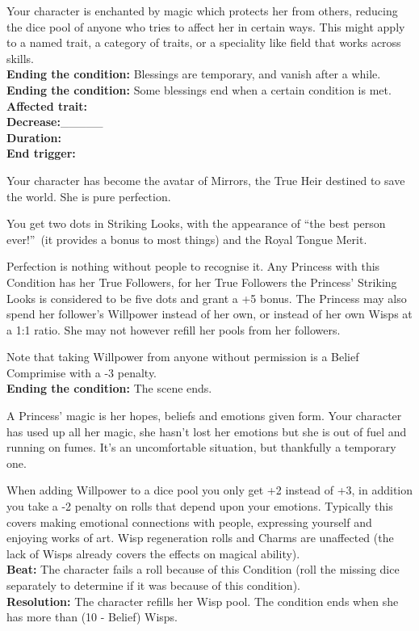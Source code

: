\documentclass[10pt, frontgrid, backgrid]{flacards}
\begin{document}
{Your character is enchanted by magic which protects her from others, reducing the dice pool of anyone who tries to affect her in certain ways. This might apply to a named trait, a category of traits, or a speciality like field that works across skills.\\
\textbf{Ending the condition:} Blessings are temporary, and vanish after a while.\\
\textbf{Ending the condition:} Some blessings end when a certain condition is met.\\
\textbf{Affected trait:}\fillunderline \\
\textbf{Decrease:}\_\_\_\_\_\\
\textbf{Duration:}\fillunderline \\
\textbf{End trigger:}\fillunderline}

{Your character has become the avatar of Mirrors, the True Heir destined to save the world. She is pure perfection. 

You get two dots in Striking Looks, with the appearance of \textquotedblleft the best person ever!\textquotedblright\, (it provides a bonus to most things) and the Royal Tongue Merit. 

Perfection is nothing without people to recognise it. Any Princess with this Condition has her True Followers, for her True Followers the Princess' Striking Looks is considered to be five dots and grant a +5 bonus. The Princess may also spend her follower's Willpower instead of her own, or instead of her own Wisps at a 1:1 ratio. She may not however refill her pools from her followers.

Note that taking Willpower from anyone without permission is a Belief Comprimise with a -3 penalty.\\
\textbf{Ending the condition:} The scene ends. }

{A Princess' magic is her hopes, beliefs and emotions given form. Your character has used up all her magic, she hasn't lost her emotions but she is out of fuel and running on fumes. It's an uncomfortable situation, but thankfully a temporary one. 

When adding Willpower to a dice pool you only get +2 instead of +3, in addition you take a -2 penalty on rolls that depend upon your emotions. Typically this covers making emotional connections with people, expressing yourself and enjoying works of art. Wisp regeneration rolls and Charms are unaffected (the lack of Wisps already covers the effects on magical ability). \\
\textbf{Beat:} The character fails a roll because of this Condition (roll the missing dice separately to determine if it was because of this condition).\\
\textbf{Resolution:} The character refills her Wisp pool. The condition ends when she has more than (10 - Belief) Wisps.}
\end{document}

